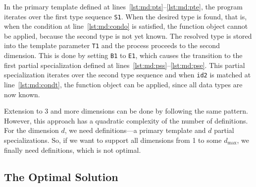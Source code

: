 \documentclass[10pt,a4paper]{article}
\theoremstyle{definition}\newtheorem{problem}{Problem}
\providecommand{\symdim}{\ensuremath{d}\xspace}
\providecommand{\symdimmax}{\ensuremath{d_{\max}}\xspace}
\begin{document}
\noindent
In the primary template defined at lines~\ref{lst:md:pts}--\ref{lst:md:pte}, the program iterates over the first type sequence \texttt{S1}. When the desired type is found, that is, when the condition at line~\ref{lst:md:condo} is satisfied, the function object cannot be applied, because the second type is not yet known. The resolved type is stored into the template parameter \texttt{T1} and the process proceeds to the second dimension. This is done by setting \texttt{B1} to \texttt{E1}, which causes the transition to the first partial specialization defined at lines~\ref{lst:md:pss}--\ref{lst:md:pse}. This partial specialization iterates over the second type sequence and when \verb|id2| is matched at line~\ref{lst:md:condt}, the function object can be applied, since all data types are now known.

Extension to 3 and more dimensions can be done by following the same pattern. However, this approach has a quadratic complexity of the number of definitions. For the dimension \symdim, we need  definitions---a primary template and \symdim partial specializations. So, if we want to support all dimensions from 1 to some \symdimmax, we finally need  definitions, which is not optimal.




\subsection{The Optimal Solution}
\end{document}
